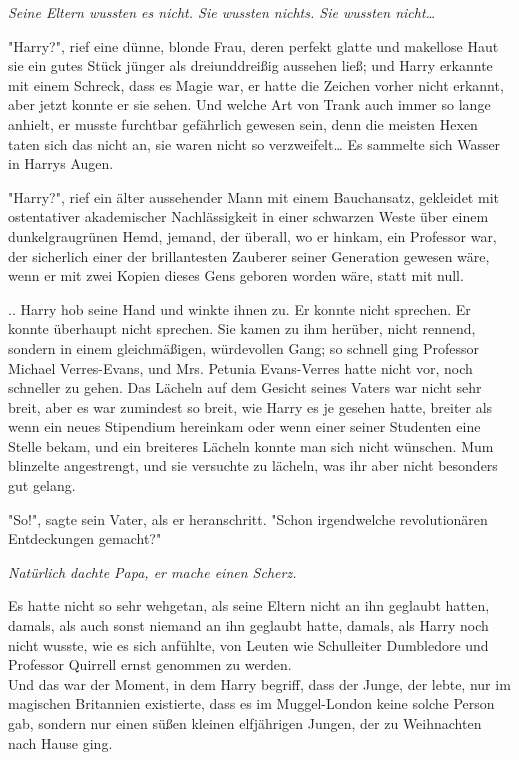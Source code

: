 {\emph{Seine Eltern wussten es nicht. Sie wussten nichts. Sie wussten nicht…}

"Harry?", rief eine dünne, blonde Frau, deren perfekt glatte und makellose Haut sie ein gutes Stück jünger als dreiunddreißig aussehen ließ; und Harry erkannte mit einem Schreck, dass es Magie war, er hatte die Zeichen vorher nicht erkannt, aber jetzt konnte er sie sehen. Und welche Art von Trank auch immer so lange anhielt, er musste furchtbar gefährlich gewesen sein, denn die meisten Hexen taten sich das nicht an, sie waren nicht so verzweifelt… Es sammelte sich Wasser in Harrys Augen.

"Harry?", rief ein älter aussehender Mann mit einem Bauchansatz, gekleidet mit ostentativer akademischer Nachlässigkeit in einer schwarzen Weste über einem dunkelgraugrünen Hemd, jemand, der überall, wo er hinkam, ein Professor war, der sicherlich einer der brillantesten Zauberer seiner Generation gewesen wäre, wenn er mit zwei Kopien dieses Gens geboren worden wäre, statt mit null.

.. Harry hob seine Hand und winkte ihnen zu. Er konnte nicht sprechen. Er konnte überhaupt nicht sprechen. Sie kamen zu ihm herüber, nicht rennend, sondern in einem gleichmäßigen, würdevollen Gang; so schnell ging Professor Michael Verres-Evans, und Mrs. Petunia Evans-Verres hatte nicht vor, noch schneller zu gehen. Das Lächeln auf dem Gesicht seines Vaters war nicht sehr breit, aber es war zumindest so breit, wie Harry es je gesehen hatte, breiter als wenn ein neues Stipendium hereinkam oder wenn einer seiner Studenten eine Stelle bekam, und ein breiteres Lächeln konnte man sich nicht wünschen. Mum blinzelte angestrengt, und sie versuchte zu lächeln, was ihr aber nicht besonders gut gelang.

"So!", sagte sein Vater, als er heranschritt. "Schon irgendwelche revolutionären Entdeckungen gemacht?"

\emph{Natürlich dachte Papa, er mache einen Scherz.}

Es hatte nicht so sehr wehgetan, als seine Eltern nicht an ihn geglaubt hatten, damals, als auch sonst niemand an ihn geglaubt hatte, damals, als Harry noch nicht wusste, wie es sich anfühlte, von Leuten wie Schulleiter Dumbledore und Professor Quirrell ernst genommen zu werden.\\ Und das war der Moment, in dem Harry begriff, dass der Junge, der lebte, nur im magischen Britannien existierte, dass es im Muggel-London keine solche Person gab, sondern nur einen süßen kleinen elfjährigen Jungen, der zu Weihnachten nach Hause ging.

}
